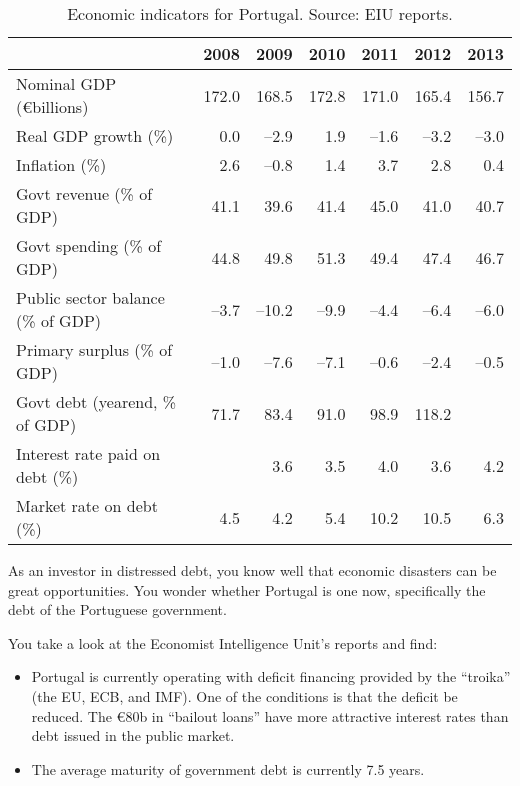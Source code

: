 \documentclass[letterpaper,12pt]{exam}
\begin{document}
\begin{questions}
\begin{table}[h]
\centering
{\small
\begin{tabular}{lrrrrrr}
\toprule
        & 2008 & 2009 & 2010 & 2011 & 2012 & 2013 \\
\midrule
Nominal GDP (\euro billions) & 172.0 & 168.5 & 172.8 & 171.0 & 165.4 & 156.7 \\
Real GDP growth (\%) & 0.0 & --2.9 & 1.9 & --1.6 & --3.2 & --3.0 \\
Inflation (\%) & 2.6 & --0.8 & 1.4 & 3.7 & 2.8 & 0.4 \\
Govt revenue (\% of GDP)  & 41.1 & 39.6 & 41.4 & 45.0 & 41.0 & 40.7 \\
Govt spending (\% of GDP) & 44.8 & 49.8 & 51.3 & 49.4 & 47.4 & 46.7  \\
Public sector balance (\% of GDP) & --3.7 & --10.2 & --9.9 & --4.4 & --6.4 & --6.0\\
Primary surplus (\% of GDP)  & --1.0 & --7.6 &  --7.1 & --0.6 & --2.4 & --0.5   \\
Govt debt (yearend, \% of GDP) & 71.7 & 83.4 & 91.0 & 98.9 & 118.2 \\
Interest rate paid on debt (\%) &  & 3.6 & 3.5 & 4.0 & 3.6	& 4.2 \\
Market rate on debt (\%)        & 4.5 & 4.2 & 5.4 & 10.2 & 10.5 & 6.3 \\
\bottomrule
\end{tabular}
}
\label{tab:portugal}
\caption{Economic indicators for Portugal.  Source:  EIU reports.}
\end{table}

As an investor in distressed debt,
you know well that economic disasters can be great opportunities.
You wonder whether Portugal is one now, specifically
the debt of the Portuguese government.

You take a look at the Economist Intelligence Unit's reports
and find:
\begin{itemize}
\item Portugal is currently operating with deficit financing
provided by the ``troika'' (the EU, ECB, and IMF).
One of the conditions is that the deficit be reduced.
The \euro 80b in ``bailout loans'' have more attractive interest rates
than debt issued in the public market.

\item The average maturity of government debt is currently 7.5 years.


\end{itemize}
\end{questions}
\end{document}

